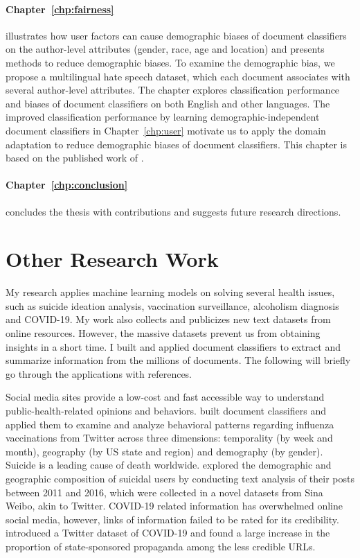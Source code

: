 \paragraph{Chapter~\ref{chp:fairness}} illustrates how user factors can cause demographic biases of document classifiers on the author-level attributes (gender, race, age and location) and presents methods to reduce demographic biases. 
To examine the demographic bias, we propose a multilingual hate speech dataset, which each document associates with several author-level attributes. 
The chapter explores classification performance and biases of document classifiers on both English and other languages. 
The improved classification performance by learning demographic-independent document classifiers in Chapter~\ref{chp:user} motivate us to apply the domain adaptation to reduce demographic biases of document classifiers. 
This chapter is based on the published work of \cite{huang2020multilingual}.

\paragraph{Chapter~\ref{chp:conclusion}} concludes the thesis with contributions and suggests future research directions.

\section{Other Research Work}

My research applies machine learning models on solving several health issues, such as suicide ideation analysis, vaccination surveillance, alcoholism diagnosis and COVID-19. 
My work also collects and publicizes new text datasets from online resources. 
However, the massive datasets prevent us from obtaining insights in a short time.
I built and applied document classifiers to extract and summarize information from the millions of documents. 
The following will briefly go through the applications with references.

Social media sites provide a low-cost and fast accessible way to understand public-health-related opinions and behaviors. \cite{huang2017examining, huang2019can} built document classifiers and applied them to examine and analyze behavioral patterns regarding influenza vaccinations from Twitter across three dimensions: temporality (by week and month), geography (by US state and region) and demography (by gender).
Suicide is a leading cause of death worldwide. \cite{huang2017exploring} explored the demographic and geographic composition of suicidal users by conducting text analysis of their posts between 2011 and 2016, which were collected in a novel datasets from Sina Weibo, akin to Twitter.
COVID-19 related information has overwhelmed online social media, however, links of information failed to be rated for its credibility. \cite{broniatowski2020covid, huang2020coronavirus} introduced a Twitter dataset of COVID-19 and found a large increase in the proportion of state-sponsored propaganda among the less credible URLs.

